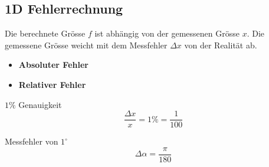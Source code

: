 \subsection{1D Fehlerrechnung}
    Die berechnete Grösse $f$ ist abhängig von der gemessenen Grösse $x$.
    Die gemessene Grösse weicht mit dem Messfehler $\Delta x$ von der Realität ab.
    \begin{itemize}
        \item \textbf{Absoluter Fehler}
            \vspace*{-0.5em}
        \item \textbf{Relativer Fehler}
            \vspace*{-0.5em}
    \end{itemize}
        \vspace{0.5em}
        \begin{minipage}{0.54\linewidth}
            \centering \vspace{4pt}
            $1\%$ Genauigkeit
            $$
                \frac{\Delta x}{x} = 1\% = \frac{1}{100}
            $$          
        \end{minipage}
        \begin{minipage}{0.45\linewidth}
            \centering
            Messfehler von $1^\circ$
            $$
                \Delta \alpha = \frac{\pi}{180}
            $$
        \end{minipage}